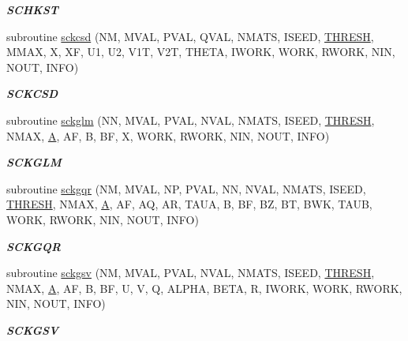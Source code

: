 \begin{DoxyCompactItemize}
\begin{DoxyCompactList}\small\item\em {\bfseries S\+C\+H\+K\+S\+T} \end{DoxyCompactList}\item 
subroutine \hyperlink{group__single__eig_ga41b0a1a7d888674eac14ad251c2d94ec}{sckcsd} (N\+M, M\+V\+A\+L, P\+V\+A\+L, Q\+V\+A\+L, N\+M\+A\+T\+S, I\+S\+E\+E\+D, \hyperlink{zlaqgs_8c_a0656018abfc9fa2821827415f5d5ea57}{T\+H\+R\+E\+S\+H}, M\+M\+A\+X, X, X\+F, U1, U2, V1\+T, V2\+T, T\+H\+E\+T\+A, I\+W\+O\+R\+K, W\+O\+R\+K, R\+W\+O\+R\+K, N\+I\+N, N\+O\+U\+T, I\+N\+F\+O)
\begin{DoxyCompactList}\small\item\em {\bfseries S\+C\+K\+C\+S\+D} \end{DoxyCompactList}\item 
subroutine \hyperlink{group__single__eig_ga0bb2e8d26a324ab0a58f7f742aef9033}{sckglm} (N\+N, M\+V\+A\+L, P\+V\+A\+L, N\+V\+A\+L, N\+M\+A\+T\+S, I\+S\+E\+E\+D, \hyperlink{zlaqgs_8c_a0656018abfc9fa2821827415f5d5ea57}{T\+H\+R\+E\+S\+H}, N\+M\+A\+X, \hyperlink{classA}{A}, A\+F, B, B\+F, X, W\+O\+R\+K, R\+W\+O\+R\+K, N\+I\+N, N\+O\+U\+T, I\+N\+F\+O)
\begin{DoxyCompactList}\small\item\em {\bfseries S\+C\+K\+G\+L\+M} \end{DoxyCompactList}\item 
subroutine \hyperlink{group__single__eig_gaf6b93922e8173c77def9bd60602f8cf0}{sckgqr} (N\+M, M\+V\+A\+L, N\+P, P\+V\+A\+L, N\+N, N\+V\+A\+L, N\+M\+A\+T\+S, I\+S\+E\+E\+D, \hyperlink{zlaqgs_8c_a0656018abfc9fa2821827415f5d5ea57}{T\+H\+R\+E\+S\+H}, N\+M\+A\+X, \hyperlink{classA}{A}, A\+F, A\+Q, A\+R, T\+A\+U\+A, B, B\+F, B\+Z, B\+T, B\+W\+K, T\+A\+U\+B, W\+O\+R\+K, R\+W\+O\+R\+K, N\+I\+N, N\+O\+U\+T, I\+N\+F\+O)
\begin{DoxyCompactList}\small\item\em {\bfseries S\+C\+K\+G\+Q\+R} \end{DoxyCompactList}\item 
subroutine \hyperlink{group__single__eig_ga44899af4fbfbe9973dcdfbce9e32977d}{sckgsv} (N\+M, M\+V\+A\+L, P\+V\+A\+L, N\+V\+A\+L, N\+M\+A\+T\+S, I\+S\+E\+E\+D, \hyperlink{zlaqgs_8c_a0656018abfc9fa2821827415f5d5ea57}{T\+H\+R\+E\+S\+H}, N\+M\+A\+X, \hyperlink{classA}{A}, A\+F, B, B\+F, U, V, Q, A\+L\+P\+H\+A, B\+E\+T\+A, R, I\+W\+O\+R\+K, W\+O\+R\+K, R\+W\+O\+R\+K, N\+I\+N, N\+O\+U\+T, I\+N\+F\+O)
\begin{DoxyCompactList}\small\item\em {\bfseries S\+C\+K\+G\+S\+V} \end{DoxyCompactList}\item 

\end{DoxyCompactItemize}
